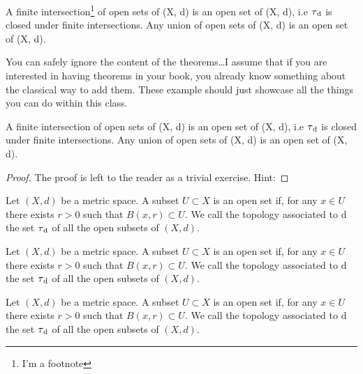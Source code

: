 
\begin{lemma}
A finite intersection\footnote{I'm a footnote} of open sets of (X, d) is 
an open set of (X, d), i.e $\tau\textsubscript{d}$ is closed under 
finite intersections. Any union of open sets of (X, d) is an open set of 
(X, d).
\end{lemma}

You can safely ignore the content of the theorems\ldots I assume that if 
you are interested in having theorems in your book, you already know 
something about the classical way to add them. These example should just 
showcase all the things you can do within this class.

\begin{corollary}
A finite intersection of open sets of (X, d) is an open set of (X, d), 
i.e $\tau\textsubscript{d}$ is closed under finite intersections. Any 
union of open sets of (X, d) is an open set of (X, d).
\end{corollary}

\begin{proof}
The proof is left to the reader as a trivial exercise. Hint: \blindtext
\end{proof}

\begin{definition}
Let $(X, d)$ be a metric space. A subset $U \subset X$ is an open set 
if, for any $x \in U$ there exists $r > 0$ such that $B(x, r) \subset 
U$. We call the topology associated to d the set $\tau\textsubscript{d}$ 
of all the open subsets of $(X, d).$
\end{definition}


\begin{example}
Let $(X, d)$ be a metric space. A subset $U \subset X$ is an open set 
if, for any $x \in U$ there exists $r > 0$ such that $B(x, r) \subset 
U$. We call the topology associated to d the set $\tau\textsubscript{d}$ 
of all the open subsets of $(X, d).$
\end{example}

\begin{remark}
Let $(X, d)$ be a metric space. A subset $U \subset X$ is an open set 
if, for any $x \in U$ there exists $r > 0$ such that $B(x, r) \subset 
U$. We call the topology associated to d the set $\tau\textsubscript{d}$ 
of all the open subsets of $(X, d).$
\end{remark}

